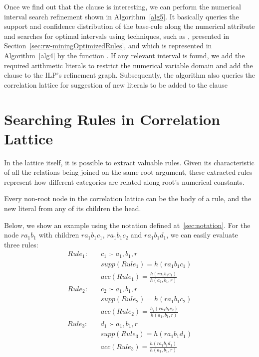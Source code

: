 Once we find out that the clause is interesting, we can perform the numerical interval search refinement
shown in Algorithm~\ref{alg5}. It basically queries the support and confidence distribution of the base-rule along the
numerical attribute and searches for optimal intervals using techniques, such as \cite{Brin99miningoptimized}, presented
in Section~\ref{sec:rw-miningOptimizedRules}, and which is represented in Algorithm~\ref{alg4} by the function
. If any relevant interval is found, we add the required arithmetic literals to
restrict the numerical variable domain and add the clause to the ILP's refinement graph. Subsequently, the
algorithm also queries the correlation lattice for suggestion of new literals to be added to the clause


\section{Searching Rules in Correlation Lattice}
\label{sec:searchRulesInCL}

In the lattice itself, it is possible to extract valuable rules. Given its characteristic of all the relations being
joined on the same root argument, these extracted rules represent how different categories are related along root's
numerical constants.

Every non-root node in the correlation lattice can be the body of a rule, and the new literal from any of
its children the head. 

Below, we show an example using the notation defined at~\ref{sec:notation}. For the node $r a_1 b_1$ with children $r
a_1 b_1 c_1$, $r a_1 b_1 c_2$ and $r a_1 b_1 d_1$, we can easily evaluate three rules:
\begin{align*}
Rule_1: \quad &c_1\text{ :- }a_1,b_1,r \\ 
&supp(Rule_1) = h(r a_1 b_1 c_1) \\
&acc(Rule_1) = \frac{h(r a_1 b_1 c_1)}{h(a_1,b_1,r)}%
\end{align*}
\begin{align*}
Rule_2: \quad &c_2\text{ :- }a_1,b_1,r \\
 &supp(Rule_2) = h(r a_1 b_1 c_2) \\
 &acc(Rule_2) = \frac{h_i(r a_1 b_1 c_2)}{h(a_1,b_1,r)} %
\end{align*}
\begin{align*}
Rule_3: \quad &d_1\text{ :- }a_1,b_1,r \\
 &supp(Rule_3) = h(r a_1 b_1 d_1) \\
 &acc(Rule_3) = \frac{h(r a_1 b_1 d_1)}{h(a_1,b_1,r)} 
\end{align*}

